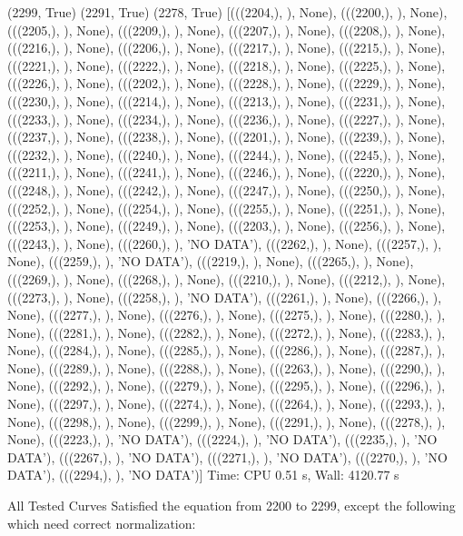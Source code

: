(2299, True)
(2291, True)
(2278, True)
[(((2204,), {}), None),
 (((2200,), {}), None),
 (((2205,), {}), None),
 (((2209,), {}), None),
 (((2207,), {}), None),
 (((2208,), {}), None),
 (((2216,), {}), None),
 (((2206,), {}), None),
 (((2217,), {}), None),
 (((2215,), {}), None),
 (((2221,), {}), None),
 (((2222,), {}), None),
 (((2218,), {}), None),
 (((2225,), {}), None),
 (((2226,), {}), None),
 (((2202,), {}), None),
 (((2228,), {}), None),
 (((2229,), {}), None),
 (((2230,), {}), None),
 (((2214,), {}), None),
 (((2213,), {}), None),
 (((2231,), {}), None),
 (((2233,), {}), None),
 (((2234,), {}), None),
 (((2236,), {}), None),
 (((2227,), {}), None),
 (((2237,), {}), None),
 (((2238,), {}), None),
 (((2201,), {}), None),
 (((2239,), {}), None),
 (((2232,), {}), None),
 (((2240,), {}), None),
 (((2244,), {}), None),
 (((2245,), {}), None),
 (((2211,), {}), None),
 (((2241,), {}), None),
 (((2246,), {}), None),
 (((2220,), {}), None),
 (((2248,), {}), None),
 (((2242,), {}), None),
 (((2247,), {}), None),
 (((2250,), {}), None),
 (((2252,), {}), None),
 (((2254,), {}), None),
 (((2255,), {}), None),
 (((2251,), {}), None),
 (((2253,), {}), None),
 (((2249,), {}), None),
 (((2203,), {}), None),
 (((2256,), {}), None),
 (((2243,), {}), None),
 (((2260,), {}), 'NO DATA'),
 (((2262,), {}), None),
 (((2257,), {}), None),
 (((2259,), {}), 'NO DATA'),
 (((2219,), {}), None),
 (((2265,), {}), None),
 (((2269,), {}), None),
 (((2268,), {}), None),
 (((2210,), {}), None),
 (((2212,), {}), None),
 (((2273,), {}), None),
 (((2258,), {}), 'NO DATA'),
 (((2261,), {}), None),
 (((2266,), {}), None),
 (((2277,), {}), None),
 (((2276,), {}), None),
 (((2275,), {}), None),
 (((2280,), {}), None),
 (((2281,), {}), None),
 (((2282,), {}), None),
 (((2272,), {}), None),
 (((2283,), {}), None),
 (((2284,), {}), None),
 (((2285,), {}), None),
 (((2286,), {}), None),
 (((2287,), {}), None),
 (((2289,), {}), None),
 (((2288,), {}), None),
 (((2263,), {}), None),
 (((2290,), {}), None),
 (((2292,), {}), None),
 (((2279,), {}), None),
 (((2295,), {}), None),
 (((2296,), {}), None),
 (((2297,), {}), None),
 (((2274,), {}), None),
 (((2264,), {}), None),
 (((2293,), {}), None),
 (((2298,), {}), None),
 (((2299,), {}), None),
 (((2291,), {}), None),
 (((2278,), {}), None),
 (((2223,), {}), 'NO DATA'),
 (((2224,), {}), 'NO DATA'),
 (((2235,), {}), 'NO DATA'),
 (((2267,), {}), 'NO DATA'),
 (((2271,), {}), 'NO DATA'),
 (((2270,), {}), 'NO DATA'),
 (((2294,), {}), 'NO DATA')]
Time: CPU 0.51 s, Wall: 4120.77 s


All Tested Curves Satisfied the equation from 2200 to 2299,
except the following which need correct normalization:

